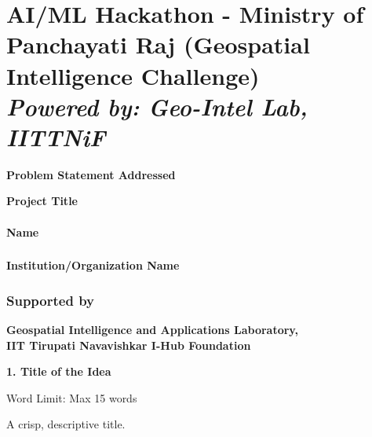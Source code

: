 \documentclass[
]{article}
\author{}
\date{}
\begin{document}
\hypertarget{aiml-hackathon---ministry-of-panchayati-raj-geospatial-intelligence-challenge-powered-by-geo-intel-lab-iittnif}{%
\section{\texorpdfstring{\textbf{AI/ML Hackathon - Ministry of
Panchayati Raj (Geospatial Intelligence Challenge)\\
}\emph{Powered by: \textbf{Geo-Intel Lab,
IITTNiF}}}{AI/ML Hackathon - Ministry of Panchayati Raj (Geospatial Intelligence Challenge) Powered by: Geo-Intel Lab, IITTNiF}}\label{aiml-hackathon---ministry-of-panchayati-raj-geospatial-intelligence-challenge-powered-by-geo-intel-lab-iittnif}}

\textbf{Problem Statement Addressed\\
}

\textbf{Project Title}

\hypertarget{name}{%
\paragraph{\texorpdfstring{\textbf{Name}}{Name}}\label{name}}

\hypertarget{section}{%
\subsubsection{}\label{section}}

\hypertarget{section-1}{%
\subsubsection{\texorpdfstring{\textbf{\hfill\break
\hfill\break
}}{  }}\label{section-1}}

\textbf{\hfill\break
Institution/Organization Name\\
}

\hypertarget{supported-by}{%
\subsubsection{Supported by}\label{supported-by}}

\textbf{Geospatial Intelligence and Applications Laboratory,\\
IIT Tirupati Navavishkar I-Hub Foundation}

\textbf{1. Title of the Idea}

Word Limit: Max 15 words

A crisp, descriptive title.
\end{document}
